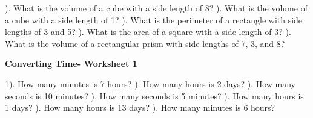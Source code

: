 \documentclass{article}%
\begin{document}
\newline%
\newline%
). What is the volume of a cube with a side length of 8?%
\newline%
\newline%
). What is the volume of a cube with a side length of 1?%
\newline%
\newline%
). What is the perimeter of a rectangle with side lengths of 3 and 5?%
\newline%
\newline%
). What is the area of a square with a side length of 3?%
\newline%
\newline%
). What is the volume of a rectangular prism with side lengths of 7, 3, and 8?%
\newline%
\newline%
\newline%
\pagebreak%
\large%
\begin{center}%
\textbf{Converting Time- Worksheet 1}%
\newline%
\end{center} \normalsize%
1). How many minutes is 7 hours?%
\newline%
\newline%
). How many hours is 2 days?%
\newline%
\newline%
). How many seconds is 10 minutes?%
\newline%
\newline%
). How many seconds is 5 minutes?%
\newline%
\newline%
). How many hours is 1 days?%
\newline%
\newline%
). How many hours is 13 days?%
\newline%
\newline%
). How many minutes is 6 hours?%
\end{document}

